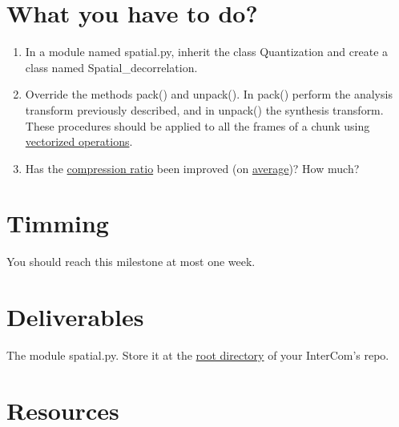\begin{comment}
Obviously, we can not use the previous algoritm for computing the RD
curves in a real-time application such as InterCom.\footnote{The
amount of computational resources would increase significatively.} We
need to make some assumptions in order to reduce the computational
cost of finding the RD curves. The first of our assumptions is that
between (temporally) adjacent chunks the RD curves are going to be
similar. Therefore, we can build the RD curve for the current chunk by
using the RD points generated\footnote{Each chunk is quantized and
compressed, so, we only need to compute the distortion to have the RD
point used for the chunk.} by the compression of previously processed
chunks. The second assumption is that we can estimate the average
slope of the complete RD curve by using only 2 RD points. Using this
information, we will try to use, for the current chunk, a pair of
$\Delta_i$ quantization steps that produce two RD curves (one curve
per subband) with the same average slope.
\end{comment}

\section{What you have to do?}

\begin{enumerate}
\item In a module named spatial.py, inherit the class
  Quantization and create a class named Spatial\_decorrelation.
\item Override the methods pack() and unpack(). In pack() perform the
  analysis transform previously described, and in unpack() the
  synthesis transform. These procedures should be applied to all the
  frames of a chunk using
  \href{https://www.oreilly.com/library/view/python-for-data/9781449323592/ch04.html}{vectorized
    operations}.
\item Has the
  \href{https://en.wikipedia.org/wiki/Data_compression_ratio}{compression
    ratio} been improved (on
  \href{https://en.wikipedia.org/wiki/Average}{average})? How much?
\end{enumerate}

\section{Timming}

You should reach this milestone at most one week.

\section{Deliverables}

The module spatial.py. Store it at the
\href{https://github.com/Tecnologias-multimedia/intercom}{root
  directory} of your InterCom's repo.

\section{Resources}


